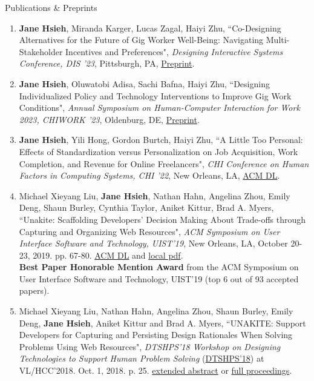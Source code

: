 \documentclass{resume}
\begin{document}
\begin{rSection}{Publications \& Preprints}
\begin{enumerate}
    \item \textbf{Jane Hsieh}, Miranda Karger, Lucas Zagal, Haiyi Zhu, ``Co-Designing Alternatives for the Future of Gig Worker Well-Being: Navigating Multi-Stakeholder Incentives and Preferences", \textit{Designing Interactive Systems Conference, DIS ’23}, Pittsburgh, PA, \href{https://janeon.github.io/resources/DIS23.pdf}{Preprint}.
    \item \textbf{Jane Hsieh}, Oluwatobi Adisa, Sachi Bafna, Haiyi Zhu, ``Designing Individualized Policy and Technology Interventions to Improve Gig Work Conditions", \textit{Annual Symposium on Human-Computer Interaction for Work 2023, CHIWORK '23}, Oldenburg, DE, \href{https://janeon.github.io/resources/CHIWORK_Position_Paper.pdf}{Preprint}.
    \item \textbf{Jane Hsieh}, Yili Hong, Gordon Burtch, Haiyi Zhu, ``A Little Too Personal: Effects of Standardization versus Personalization on Job Acquisition, Work Completion, and Revenue for Online Freelancers", \textit{CHI Conference on Human Factors in Computing Systems, CHI ’22}, New Orleans, LA, \href{https://dl.acm.org/doi/pdf/10.1145/3491102.3517546}{ACM DL}.
    \item Michael Xieyang Liu, \textbf{Jane Hsieh}, Nathan Hahn, Angelina Zhou, Emily Deng, Shaun Burley, Cynthia Taylor, Aniket Kittur, Brad A. Myers, ``Unakite: Scaffolding Developers’ Decision Making About Trade-offs through Capturing and Organizing Web Resources", \textit{ACM Symposium on User Interface Software and Technology, UIST'19}, New Orleans, LA, October 20-23, 2019. pp. 67-80. \href{https://dl.acm.org/citation.cfm?id=3347908}{ACM DL} and \href{http://www.cs.cmu.edu/~NatProg/papers/p67-liu-Unakite-UIST.pdf}{local pdf}.\\
    \textbf{Best Paper Honorable Mention Award} from the ACM Symposium on User Interface Software and Technology, UIST'19 (top 6 out of 93 accepted papers). 
    \item Michael Xieyang Liu, Nathan Hahn, Angelina Zhou, Shaun Burley, Emily Deng, \textbf{Jane Hsieh}, Aniket Kittur and Brad A. Myers, ``UNAKITE: Support Developers for Capturing and Persisting Design Rationales When Solving Problems Using Web Resources", \textit{DTSHPS'18 Workshop on Designing Technologies to Support Human Problem Solving} (\href{https://www.cs.washington.edu/dtshps2018/index.html}{DTSHPS'18}) at VL/HCC'2018. Oct. 1, 2018. p. 25. \href{\myurl}{extended abstract} or \href{\myurl2}{full proceedings}.

\end{enumerate}
\end{rSection}
\end{document}
